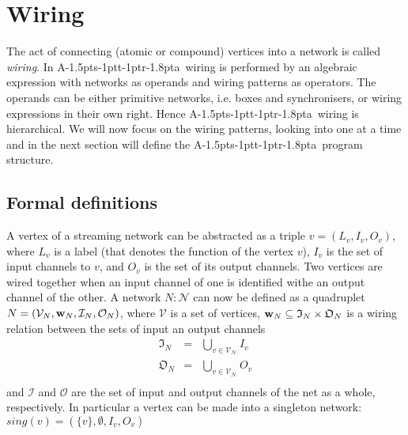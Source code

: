 \documentclass[11pt]{report}
\def\ak{{\textsf{A\kern-1.5pts\kern-1ptt\kern-1ptr\kern-1.8pta}}\kern-2pt{\it K\kern-2ptahn}}
\begin{document}
\section{Wiring\label{sec:wiring}}

The act of connecting (atomic or compound) vertices into a network is called {\em wiring}. In \ak\ wiring is performed by an algebraic expression
with networks as operands and wiring patterns as operators. The operands can be either primitive networks, i.e. boxes
and synchronisers, or wiring expressions in their own right. Hence \ak\ wiring is hierarchical. We will now focus on
the wiring patterns, looking into one at a time and in the next section will define the \ak\ program structure.


\subsection{Formal definitions}

A vertex of a streaming network can be abstracted as a triple $v=(L_v, I_v, O_v)$, where $L_v$ is a label (that denotes
the function of the vertex $v$), $I_v$ is the set of input channels to $v$, and $O_v$ is the set of its output channels.
Two vertices are wired together when an input channel of one is identified withe an output channel of the other.
A network $N:\mathcal{N}$ can now be defined as a quadruplet $N=(\mathcal{V}_N, \hbox{\bf w}_N, \mathcal{I}_N, \mathcal{O}_N)$,
where $\mathcal{V}$ is a set of vertices, $\hbox{\bf w}_N\subseteq \mathfrak{I}_N\times\mathfrak{O}_N$ is a wiring relation
between the sets of input an output channels
\begin{eqnarray*}
\mathfrak{I}_N &=& \bigcup_{v\in\mathcal{V_N}} I_v \nonumber\\
\mathfrak{O}_N &=& \bigcup_{v\in\mathcal{V_N}} O_v \nonumber\\
\end{eqnarray*}
and
$\mathcal{I}$ and $ \mathcal{O}$ are the set of input and output channels of the net as a whole, respectively.
In particular a vertex can be made into a singleton network: $sing(v) = (\{v\},\emptyset, I_v, O_v)$
\end{document}
